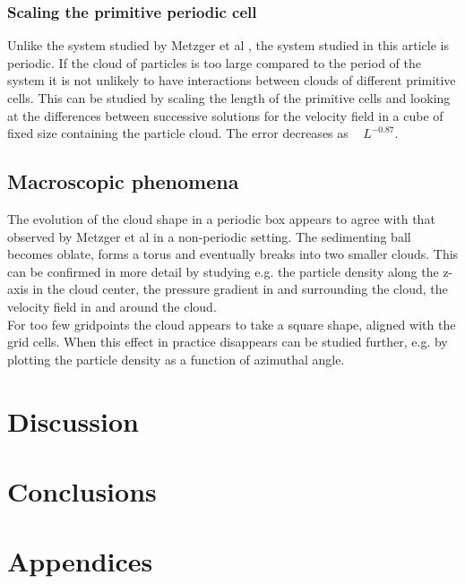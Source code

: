 \documentclass[a4paper,twoside=false,abstract=false,numbers=noenddot,
titlepage=false,headings=small,parskip=half,version=last]{scrartcl}
\begin{document}
\subsubsection{Scaling the primitive periodic cell}\label{cellscale}
Unlike the system studied by Metzger et al \cite{fallingclouds}, the system studied in this article is periodic. If the cloud of particles is too large compared to the period of the system it is not unlikely to have interactions between clouds of different primitive cells. This can be studied by scaling the length of the primitive cells and looking at the differences between successive solutions for the velocity field in a cube of fixed size containing the particle cloud. The error decreases as ~ $L^{-0.87}$.

\subsection{Macroscopic phenomena}
The evolution of the cloud shape in a periodic box appears to agree with that observed by Metzger et al \cite{fallingclouds} in a non-periodic setting. The sedimenting ball becomes oblate, forms a torus and eventually breaks into two smaller clouds. This can be confirmed in more detail by studying e.g. the particle density along the z-axis in the cloud center, the pressure gradient in and surrounding the cloud, the velocity field in and around the cloud.\\
For too few gridpoints the cloud appears to take a square shape, aligned with the grid cells. When this effect in practice disappears can be studied further, e.g. by plotting the particle density as a function of azimuthal angle.\\

\section{Discussion}

\section{Conclusions}





\section{Appendices}
\end{document}
